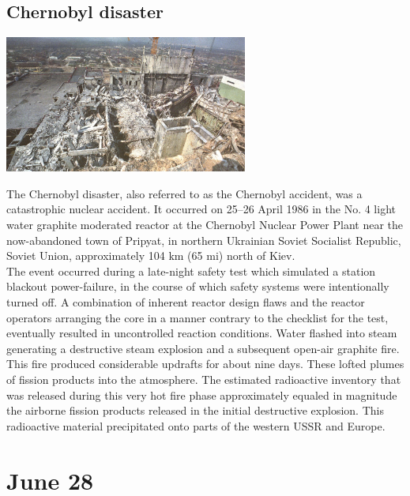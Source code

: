 \documentclass[11pt]{report}
\begin{document}
\subsection{Chernobyl disaster}
\vspace{2mm}\begin{center}\includegraphics[width=8cm]{./img/chernobyl.jpg}\end{center}
The Chernobyl disaster, also referred to as the Chernobyl accident, was a catastrophic nuclear accident. It occurred on 25–26 April 1986 in the No. 4 light water graphite moderated reactor at the Chernobyl Nuclear Power Plant near the now-abandoned town of Pripyat, in northern Ukrainian Soviet Socialist Republic, Soviet Union, approximately 104 km (65 mi) north of Kiev.\\
\indent The event occurred during a late-night safety test which simulated a station blackout power-failure, in the course of which safety systems were intentionally turned off. A combination of inherent reactor design flaws and the reactor operators arranging the core in a manner contrary to the checklist for the test, eventually resulted in uncontrolled reaction conditions. Water flashed into steam generating a destructive steam explosion and a subsequent open-air graphite fire. This fire produced considerable updrafts for about nine days. These lofted plumes of fission products into the atmosphere. The estimated radioactive inventory that was released during this very hot fire phase approximately equaled in magnitude the airborne fission products released in the initial destructive explosion. This radioactive material precipitated onto parts of the western USSR and Europe.
\section{June 28}
\end{document}
